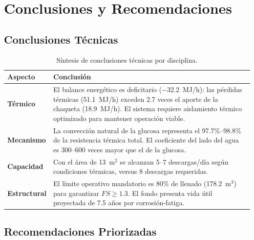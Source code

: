 \documentclass[11pt,a4paper]{article}
\begin{document}
\section{Conclusiones y Recomendaciones}

\subsection{Conclusiones Técnicas}

\begin{table}[H]
\centering
\footnotesize
\caption{Síntesis de conclusiones técnicas por disciplina.}
\label{tab:conclusiones}
\begin{tabular}{@{}p{2.5cm}p{11cm}@{}}
\toprule
\textbf{Aspecto} & \textbf{Conclusión} \\
\midrule
\textbf{Térmico} & El balance energético es deficitario ($-$32.2~MJ/h): las pérdidas térmicas (51.1~MJ/h) exceden 2.7 veces el aporte de la chaqueta (18.9~MJ/h). El sistema requiere aislamiento térmico optimizado para mantener operación viable. \\
\midrule
\textbf{Mecanismo} & La convección natural de la glucosa representa el 97.7\%--98.8\% de la resistencia térmica total. El coeficiente del lado del agua es 300--600 veces mayor que el de la glucosa. \\
\midrule
\textbf{Capacidad} & Con el área de 13~m$^2$ se alcanzan 5--7 descargas/día según condiciones térmicas, versus 8 descargas requeridas. \\
\midrule
\textbf{Estructural} & El límite operativo mandatorio es 80\% de llenado (178.2~m$^3$) para garantizar $FS \geq 1.3$. El fondo presenta vida útil proyectada de 7.5 años por corrosión-fatiga. \\
\bottomrule
\end{tabular}
\end{table}

\subsection{Recomendaciones Priorizadas}
\end{document}
